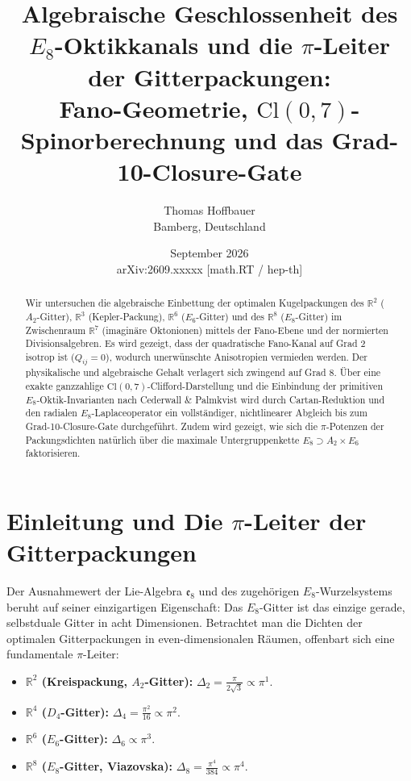\documentclass[11pt,a4paper]{article}
\title{\textbf{Algebraische Geschlossenheit des $E_8$-Oktikkanals und die $\pi$-Leiter der Gitterpackungen:\\Fano-Geometrie, $\text{Cl}(0,7)$-Spinorberechnung und das Grad-10-Closure-Gate}}
\author{Thomas Hoffbauer \\ \small Bamberg, Deutschland}
\date{September 2026 \\[1ex] \small arXiv:2609.xxxxx [math.RT / hep-th]}
\begin{document}
\maketitle

\begin{abstract}
Wir untersuchen die algebraische Einbettung der optimalen Kugelpackungen des $\mathbb{R}^2$ ($A_2$-Gitter), $\mathbb{R}^3$ (Kepler-Packung), $\mathbb{R}^6$ ($E_6$-Gitter) und des $\mathbb{R}^8$ ($E_8$-Gitter) im Zwischenraum $\mathbb{R}^7$ (imaginäre Oktonionen) mittels der Fano-Ebene und der normierten Divisionsalgebren. Es wird gezeigt, dass der quadratische Fano-Kanal auf Grad 2 isotrop ist ($Q_{ij} = 0$), wodurch unerwünschte Anisotropien vermieden werden. Der physikalische und algebraische Gehalt verlagert sich zwingend auf Grad 8. Über eine exakte ganzzahlige $\text{Cl}(0,7)$-Clifford-Darstellung und die Einbindung der primitiven $E_8$-Oktik-Invarianten nach Cederwall \& Palmkvist wird durch Cartan-Reduktion und den radialen $E_8$-Laplaceoperator ein vollständiger, nichtlinearer Abgleich bis zum Grad-10-Closure-Gate durchgeführt. Zudem wird gezeigt, wie sich die $\pi$-Potenzen der Packungsdichten natürlich über die maximale Untergruppenkette $E_8 \supset A_2 \times E_6$ faktorisieren.
\end{abstract}

\section{Einleitung und Die $\pi$-Leiter der Gitterpackungen}
Der Ausnahmewert der Lie-Algebra $\mathfrak{e}_8$ und des zugehörigen $E_8$-Wurzelsystems beruht auf seiner einzigartigen Eigenschaft: Das $E_8$-Gitter ist das einzige gerade, selbstduale Gitter in acht Dimensionen. Betrachtet man die Dichten der optimalen Gitterpackungen in even-dimensionalen Räumen, offenbart sich eine fundamentale $\pi$-Leiter:
\begin{itemize}
    \item \textbf{$\mathbb{R}^2$ (Kreispackung, $A_2$-Gitter):} $\Delta_2 = \frac{\pi}{2\sqrt{3}} \propto \pi^1$.
    \item \textbf{$\mathbb{R}^4$ ($D_4$-Gitter):} $\Delta_4 = \frac{\pi^2}{16} \propto \pi^2$.
    \item \textbf{$\mathbb{R}^6$ ($E_6$-Gitter):} $\Delta_6 \propto \pi^3$.
    \item \textbf{$\mathbb{R}^8$ ($E_8$-Gitter, Viazovska):} $\Delta_8 = \frac{\pi^4}{384} \propto \pi^4$.
\end{itemize}
\end{document}
